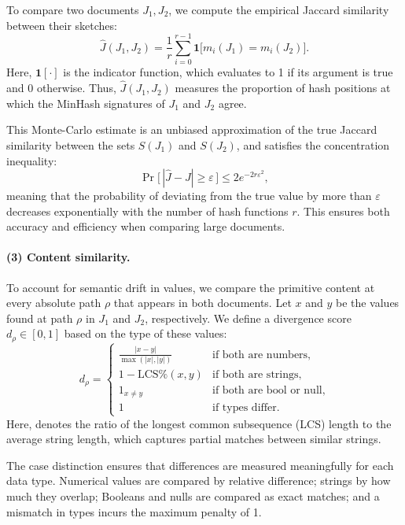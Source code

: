 \documentclass[sigconf]{acmart}
\begin{document}
To compare two documents \(J_{1}, J_{2}\), we compute the empirical Jaccard similarity between their sketches:
\[
  \widehat{J}(J_{1}, J_{2}) = \frac{1}{r} \sum_{i=0}^{r-1} \mathbf{1}\bigl[ m_{i}(J_{1}) = m_{i}(J_{2}) \bigr].
\]
Here, \(\mathbf{1}[\cdot]\) is the indicator function, which evaluates to 1 if its argument is true and 0 otherwise. Thus, \(\widehat{J}(J_1, J_2)\) measures the proportion of hash positions at which the MinHash signatures of \(J_1\) and \(J_2\) agree.

This Monte-Carlo estimate is an unbiased approximation of the true Jaccard similarity between the sets \(S(J_{1})\) and \(S(J_{2})\), and satisfies the concentration inequality:
\[
  \Pr\bigl[\,|\widehat{J} - J| \ge \varepsilon\,\bigr] \le 2e^{-2r\varepsilon^{2}},
\]
meaning that the probability of deviating from the true value by more than \(\varepsilon\) decreases exponentially with the number of hash functions \(r\).  
This ensures both accuracy and efficiency when comparing large documents.

\paragraph{(3) Content similarity.}
To account for semantic drift in values, we compare the primitive content at every absolute path \(\rho\) that appears in both documents.  
Let \(x\) and \(y\) be the values found at path \(\rho\) in \(J_1\) and \(J_2\), respectively.  
We define a divergence score \(d_{\rho} \in [0,1]\) based on the type of these values:
\[
  d_{\rho} =
  \begin{cases}
     \displaystyle\frac{|x-y|}{\max(|x|,|y|)} & \text{if both are numbers},\\[6pt]
     1 - \text{LCS\%}(x,y)                    & \text{if both are strings},\\
     1_{x \neq y}                             & \text{if both are bool or null},\\
     1                                        & \text{if types differ}.
  \end{cases}
\]
Here,  denotes the ratio of the longest common subsequence (LCS) length to the average string length,  
which captures partial matches between similar strings.

The case distinction ensures that differences are measured meaningfully for each data type.  
Numerical values are compared by relative difference; strings by how much they overlap;  
Booleans and nulls are compared as exact matches; and a mismatch in types incurs the maximum penalty of 1.
\end{document}
